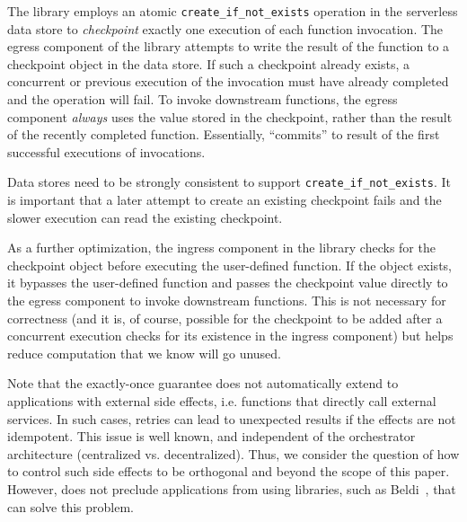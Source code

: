 The \name{} library employs an atomic \texttt{create\_if\_not\_exists}
operation in the serverless data store to \emph{checkpoint} exactly one
execution of each function invocation. The egress component of the \name{}
library attempts to write the result of the function to a checkpoint object in
the data store. If such a checkpoint already exists, a concurrent or previous
execution of the invocation must have already completed and the operation will
fail. To invoke downstream functions, the egress component \emph{always} uses
the value stored in the checkpoint, rather than the result of the recently
completed function. Essentially, \name{} ``commits'' to result of the first
successful executions of invocations.

Data stores need to be strongly consistent to support
\texttt{create\_if\_not\_exists}. It is important that a later attempt to
create an existing checkpoint fails and the slower execution can read the
existing checkpoint.

As a further optimization, the ingress component in the \name{} library checks
for the checkpoint object before executing the user-defined function. If the
object exists, it bypasses the user-defined function and passes the checkpoint
value directly to the egress component to invoke downstream functions. This is
not necessary for correctness (and it is, of course, possible for the checkpoint
to be added after a concurrent execution checks for its existence in the ingress
component) but helps reduce computation that we know will go unused.

Note that the exactly-once guarantee does not automatically extend to
applications with external side effects, i.e. functions that directly call
external services. In such cases, retries can lead to unexpected results if
the effects are not idempotent. This issue is well known, and independent of
the orchestrator architecture (centralized vs. decentralized). Thus, we
consider the question of how to control such side effects to be orthogonal and
beyond the scope of this paper. However, \name{} does not preclude
applications from using libraries, such as Beldi~\cite{beldi}, that can solve
this problem.



